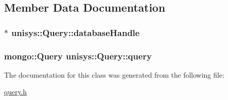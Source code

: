 \subsection{Member Data Documentation}
\hypertarget{classunisys_1_1Query_ac2341bd1258446f1af5e33ad3426bdb3}{
\subsubsection[{database\-Handle}]{$\ast$ unisys\-::\-Query\-::database\-Handle\hspace{0.3cm}{\ttfamily [private]}}}\label{classunisys_1_1Query_ac2341bd1258446f1af5e33ad3426bdb3}
\hypertarget{classunisys_1_1Query_af86fd3dc2340b9b91452a47b338e5010}{
\subsubsection[{query}]{\setlength{\rightskip}{0pt plus 5cm}mongo\-::\-Query unisys\-::\-Query\-::query\hspace{0.3cm}{\ttfamily [private]}}}\label{classunisys_1_1Query_af86fd3dc2340b9b91452a47b338e5010}


The documentation for this class was generated from the following file\-:\begin{DoxyCompactItemize}
\item 
\hyperlink{query_8h}{query.\-h}\end{DoxyCompactItemize}

